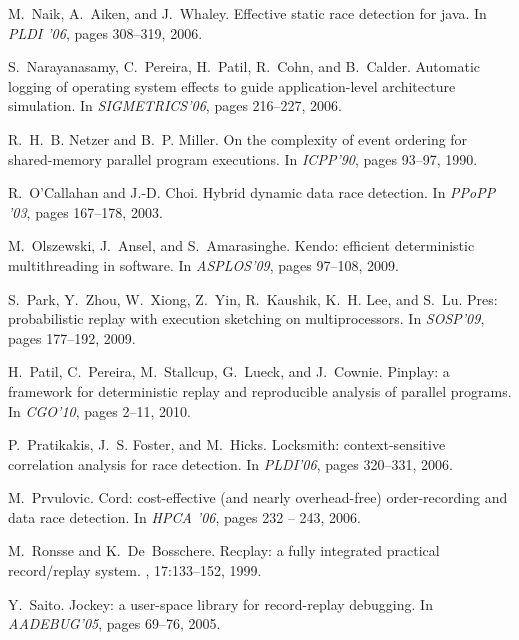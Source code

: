 \documentclass[10pt,onecolumn,letterpaper]{article}
\begin{document}
{\begin{thebibliography}{10}
M.~Naik, A.~Aiken, and J.~Whaley.
\newblock Effective static race detection for java.
\newblock In {\em PLDI '06}, pages 308--319, 2006.

S.~Narayanasamy, C.~Pereira, H.~Patil, R.~Cohn, and B.~Calder.
\newblock Automatic logging of operating system effects to guide
  application-level architecture simulation.
\newblock In {\em SIGMETRICS'06}, pages 216--227, 2006.

R.~H.~B. Netzer and B.~P. Miller.
\newblock On the complexity of event ordering for shared-memory parallel
  program executions.
\newblock In {\em ICPP'90}, pages 93--97, 1990.

R.~O'Callahan and J.-D. Choi.
\newblock Hybrid dynamic data race detection.
\newblock In {\em PPoPP '03}, pages 167--178, 2003.

M.~Olszewski, J.~Ansel, and S.~Amarasinghe.
\newblock Kendo: efficient deterministic multithreading in software.
\newblock In {\em ASPLOS'09}, pages 97--108, 2009.

S.~Park, Y.~Zhou, W.~Xiong, Z.~Yin, R.~Kaushik, K.~H. Lee, and
S.~Lu.
\newblock Pres: probabilistic replay with execution sketching on
  multiprocessors.
\newblock In {\em SOSP'09}, pages 177--192, 2009.

H.~Patil, C.~Pereira, M.~Stallcup, G.~Lueck, and J.~Cownie.
\newblock Pinplay: a framework for deterministic replay and reproducible
  analysis of parallel programs.
\newblock In {\em CGO'10}, pages 2--11, 2010.

P.~Pratikakis, J.~S. Foster, and M.~Hicks.
\newblock Locksmith: context-sensitive correlation analysis for race detection.
\newblock In {\em PLDI'06}, pages 320--331, 2006.

M.~Prvulovic.
\newblock Cord: cost-effective (and nearly overhead-free) order-recording and
  data race detection.
\newblock In {\em HPCA '06}, pages 232 -- 243, 2006.

M.~Ronsse and K.~De~Bosschere.
\newblock Recplay: a fully integrated practical record/replay system.
, 17:133--152, 1999.

Y.~Saito.
\newblock Jockey: a user-space library for record-replay debugging.
\newblock In {\em AADEBUG'05}, pages 69--76, 2005.


\end{thebibliography}}
\end{document}
